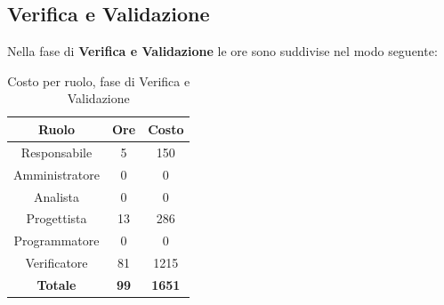 \subsection{Verifica e Validazione}
Nella fase di \textbf{Verifica e Validazione} le ore sono suddivise nel modo seguente:
\begin{table}[H]
	\centering
	\begin{tabular}{|c|c|c|}
		\hline
		\textbf{Ruolo} &
		\textbf{Ore} &
		\textbf{Costo} \\
		\hline
		Responsabile & 5 & 150\\
		\hline
		Amministratore & 0 & 0\\
		\hline
		Analista & 0 & 0\\
		\hline
		Progettista & 13 & 286 \\
		\hline
		Programmatore & 0 & 0 \\
		\hline
		Verificatore & 81 & 1215\\
		\hline
		\textbf{Totale} & \textbf{99} & \textbf{1651} \\
		\hline
	\end{tabular}
	\caption{Costo per ruolo, fase di Verifica e Validazione}
\end{table}


